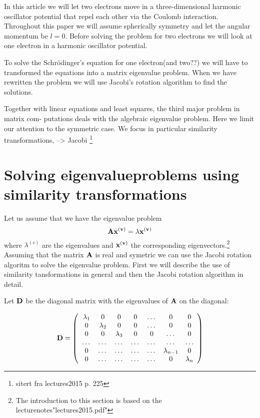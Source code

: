 \documentclass[11pt,a4wide]{article}
\begin{document}
In this article we will let two electrons move in a three-dimensional harmonic oscillator potential that repel each other via the Coulomb interaction.  Throughout this paper we will assume spherically symmetry and let the angular momentum be $l=0$. Before solving the problem for two electrons we will look at one electron in a harmonic oscillator potential. 

To solve the Schr\"odinger's equation for one electron(and two??) we will have to transformed the equations into a matrix eigenvalue problem. When we have rewritten the problem we will use Jacobi's rotation algorithm to find the solutions. %

Together with linear equations and least squares, the third major problem in matrix com- putations deals with the algebraic eigenvalue problem. Here we limit our attention to the symmetric case. We focus in particular similarity transformations, --> Jacobi \footnote{sitert fra lectures2015 p. 225}


\section{Solving eigenvalueproblems using similarity transformations}

Let us assume that we have the eigenvalue problem 
\[
\bf A \bf x^{(v)} = \lambda \bf x^{(v)}
\]
where $\lambda^{(v)}$ are the eigenvalues and $\bf x^{(v)}$ the corresponding eigenvectors.\footnote{The introduction to this section is based on the lecturenotes"lectures2015.pdf"} Assuming that the matrix $\bf A$ is real and symetric we can use the Jacobi rotation algoritm to solve the eigenvalue problem. First we will describe the use of similarity tansformations in general and then the Jacobi rotation algorithm in detail.

Let $\bf D$ be the diagonal matrix with the eigenvalues of $\bf A$ on the diagonal:

\begin{equation}
    \bf D = \left( \begin{array}{ccccccc} \lambda_1 & 0 & 0   & 0    & \dots  &0     & 0 \\
                                0  & \lambda_2 & 0 & 0    & \dots  &0     &0 \\
                                0   & 0 & \lambda_3 & 0  &0       &\dots & 0\\
                                \dots  & \dots & \dots & \dots  &\dots      &\dots & \dots\\
                                0   & \dots & \dots & \dots  &\dots       &\lambda_{n-1} & 0\\
                                0   & \dots & \dots & \dots  &\dots       &0 & \lambda_n

             \end{array} \right) 
      \label{eq:sematrix}
\end{equation} 
\end{document}
